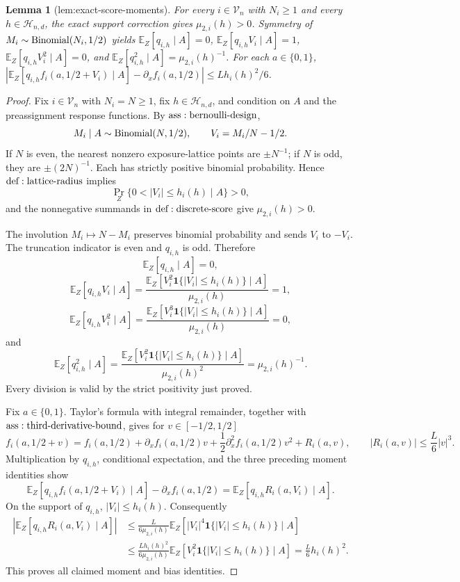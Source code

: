 \documentclass{article}
\newtheorem{lemma}{Lemma}
\begin{document}
\begin{lemma}[lem:exact-score-moments]\label{lem:exact-score-moments}
For every \(i\in\mathcal V_n\) with \(N_i\ge1\) and every \(h\in\mathcal H_{n,d}\), the exact support correction gives \(\mu_{2,i}(h)>0\). Symmetry of \(M_i\sim{\rm Binomial}(N_i,1/2)\) yields \(\mathbb E_Z[q_{i,h}\mid A]=0\), \(\mathbb E_Z[q_{i,h}V_i\mid A]=1\), \(\mathbb E_Z[q_{i,h}V_i^2\mid A]=0\), and \(\mathbb E_Z[q_{i,h}^2\mid A]=\mu_{2,i}(h)^{-1}\). For each \(a\in\{0,1\}\), \(|\mathbb E_Z[q_{i,h}f_i(a,1/2+V_i)\mid A]-\partial_xf_i(a,1/2)|\le Lh_i(h)^2/6\).
\end{lemma}
\begin{proof}
Fix \(i\in\mathcal V_n\) with \(N_i=N\geq1\), fix \(h\in\mathcal H_{n,d}\), and condition on \(A\) and the preassignment response functions.  By \({\rm ass:bernoulli\text{-}design}\),
\[
 M_i\mid A\sim {\rm Binomial}(N,1/2),\qquad V_i=M_i/N-1/2.
\]
If \(N\) is even, the nearest nonzero exposure-lattice points are \(\pm N^{-1}\); if \(N\) is odd, they are \(\pm(2N)^{-1}\).  Each has strictly positive binomial probability.  Hence \({\rm def:lattice\text{-}radius}\) implies
\[
 \Pr_Z\{0<|V_i|\leq h_i(h)\mid A\}>0,
\]
and the nonnegative summands in \({\rm def:discrete\text{-}score}\) give \(\mu_{2,i}(h)>0\).

The involution \(M_i\mapsto N-M_i\) preserves binomial probability and sends \(V_i\) to \(-V_i\).  The truncation indicator is even and \(q_{i,h}\) is odd.  Therefore
\[
 \mathbb E_Z[q_{i,h}\mid A]=0,
\]
\[
 \mathbb E_Z[q_{i,h}V_i\mid A]
 =\frac{\mathbb E_Z[V_i^2\mathbf1\{|V_i|\leq h_i(h)\}\mid A]}{\mu_{2,i}(h)}=1,
\]
\[
 \mathbb E_Z[q_{i,h}V_i^2\mid A]
 =\frac{\mathbb E_Z[V_i^3\mathbf1\{|V_i|\leq h_i(h)\}\mid A]}{\mu_{2,i}(h)}=0,
\]
and
\[
 \mathbb E_Z[q_{i,h}^2\mid A]
 =\frac{\mathbb E_Z[V_i^2\mathbf1\{|V_i|\leq h_i(h)\}\mid A]}{\mu_{2,i}(h)^2}
 =\mu_{2,i}(h)^{-1}.
\]
Every division is valid by the strict positivity just proved.

Fix \(a\in\{0,1\}\).  Taylor's formula with integral remainder, together with \({\rm ass:third\text{-}derivative\text{-}bound}\), gives for \(v\in[-1/2,1/2]\)
\[
 f_i(a,1/2+v)=f_i(a,1/2)+\partial_xf_i(a,1/2)v
 +\frac12\partial_x^2f_i(a,1/2)v^2+R_i(a,v),
 \qquad |R_i(a,v)|\leq \frac L6|v|^3.
\]
Multiplication by \(q_{i,h}\), conditional expectation, and the three preceding moment identities show
\[
 \mathbb E_Z[q_{i,h}f_i(a,1/2+V_i)\mid A]-\partial_xf_i(a,1/2)
 =\mathbb E_Z[q_{i,h}R_i(a,V_i)\mid A].
\]
On the support of \(q_{i,h}\), \(|V_i|\leq h_i(h)\).  Consequently
\[
\begin{aligned}
 \left|\mathbb E_Z[q_{i,h}R_i(a,V_i)\mid A]\right|
 &\leq \frac{L}{6\mu_{2,i}(h)}
 \mathbb E_Z[|V_i|^4\mathbf1\{|V_i|\leq h_i(h)\}\mid A]\\
 &\leq \frac{Lh_i(h)^2}{6\mu_{2,i}(h)}
 \mathbb E_Z[V_i^2\mathbf1\{|V_i|\leq h_i(h)\}\mid A]
 =\frac L6h_i(h)^2.
\end{aligned}
\]
This proves all claimed moment and bias identities.
\end{proof}
\end{document}
